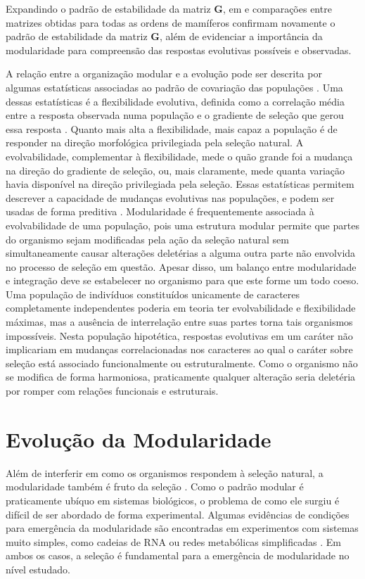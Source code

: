 Expandindo o padrão de estabilidade da matriz $\mathbf{G}$, em \cite{Porto2009} e
\cite{Marroig2009} comparações entre matrizes obtidas para todas as
ordens de mamíferos confirmam novamente o padrão de estabilidade da matriz
$\mathbf{G}$, além de evidenciar a importância da modularidade para compreensão das
respostas evolutivas possíveis e observadas.

A relação entre a organização modular e a evolução pode ser descrita por
algumas estatísticas associadas ao padrão de covariação das populações
\citep{Hansen2008}.
Uma dessas estatísticas é a flexibilidade evolutiva, definida como a
correlação média entre a resposta observada numa população e o gradiente
de seleção que gerou essa resposta \citep{Marroig2009}.
Quanto mais alta a flexibilidade, mais capaz a população é de responder
na direção morfológica privilegiada pela seleção natural.
A evolvabilidade, complementar à flexibilidade, mede o quão grande foi a
mudança na direção do gradiente de seleção, ou, mais claramente, mede
quanta variação havia disponível na direção privilegiada pela seleção.
Essas estatísticas permitem descrever a capacidade de mudanças evolutivas
nas populações, e podem ser usadas de forma preditiva
\citep[veja, por exemplo,][]{Marroig2010}.
Modularidade é frequentemente associada à evolvabilidade de uma
população, pois uma estrutura modular permite que partes do organismo sejam
modificadas pela ação da seleção natural sem simultaneamente causar
alterações deletérias a alguma outra parte não envolvida no processo de
seleção em questão.
Apesar disso, um balanço entre modularidade e integração deve se
estabelecer no organismo para que este forme um todo coeso.
Uma população de indivíduos constituídos unicamente de caracteres
completamente independentes poderia em teoria ter evolvabilidade e
flexibilidade máximas, mas a ausência de interrelação entre suas partes
torna tais organismos impossíveis.
Nesta população hipotética, respostas evolutivas em um caráter não
implicariam em mudanças correlacionadas nos caracteres ao qual o caráter
sobre seleção está associado funcionalmente ou estruturalmente.
Como o organismo não se modifica de forma harmoniosa, praticamente
qualquer alteração seria deletéria por romper com relações funcionais e
estruturais.

\section{Evolução da Modularidade}\label{intro:evolucao}

Além de interferir em como os organismos respondem à seleção natural, a
modularidade também é fruto da seleção \citep{Wagner1996, Wagner2007}.
Como o padrão modular é praticamente ubíquo em sistemas biológicos, o
problema de como ele surgiu é difícil de ser abordado de forma
experimental.
Algumas evidências de condições para emergência da modularidade são
encontradas em experimentos com sistemas muito simples, como cadeias de
RNA \citep{Ancel2000} ou redes metabólicas simplificadas
\citep{Espinosa-Soto2010}.
Em ambos os casos, a seleção é fundamental para a emergência
de modularidade no nível estudado.

